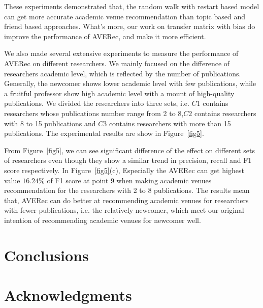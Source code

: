 \documentclass[9pt]{acm_proc_article-sp}
\begin{document}
These experiments demonstrated that, the random walk with restart based model can get more accurate academic venue recommendation than topic based and friend based approaches. What's more, our work on transfer matrix with bias do improve the performance of AVERec, and make it more efficient.

We also made several extensive experiments to measure the performance of AVERec on different researchers. We mainly focused on the difference of researchers academic level, which is reflected by the number of publications. Generally, the newcomer shows lower academic level with few publications, while a fruitful professor show high academic level with a mount of high-quality publications. We divided the researchers into three sets, i.e. $C1$ contains researchers whose publications number range from 2 to 8,$C2$ contains researchers with 8 to 15 publications and $C3$ contains researchers with more than 15 publications. The experimental results are show in Figure~\ref{fig5}.


From Figure~\ref{fig5}, we can see significant difference of the effect on different sets of researchers even though they show a similar trend in precision, recall and F1 score respectively. In Figure~\ref{fig5}(c), Especially the AVERec can get highest value $16.24\%$ of F1 score at point 9 when making academic venues recommendation for the researchers with 2 to 8 publications. The results mean that, AVERec can do better at recommending academic venues for researchers with fewer publications, i.e. the relatively newcomer, which meet our original intention of recommending academic venues for newcomer well.

\section{Conclusions}


\section{Acknowledgments}



\balancecolumns
\end{document}
